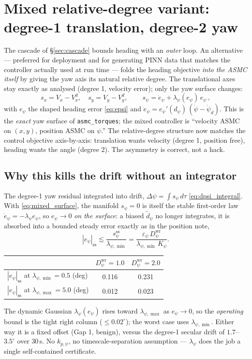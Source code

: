 \documentclass[11pt]{article}
\theoremstyle{plain}
\theoremstyle{definition}
\newcommand{\Vx}{V_x}
\newcommand{\Vy}{V_y}
\newcommand{\Dwr}{D^{\mathrm{wr}}}
\begin{document}
\section{Mixed relative-degree variant: degree-1 translation, degree-2 yaw}
\label{sec:mixed}
The cascade of \S\ref{sec:cascade} bounds heading with an \emph{outer} loop. An
alternative --- preferred for deployment and for generating PINN data that matches the
controller actually used at run time --- folds the heading objective \emph{into the
ASMC itself} by giving the yaw axis its natural relative degree. The translational axes
stay exactly as analysed (degree 1, velocity error); only the yaw surface changes:
\begin{equation}
s_x=\Vx-\Vx^d,\quad s_y=\Vy-\Vy^d,\qquad
\boxed{\,s_\psi=\dot e_\psi+\lambda_\psi(e_\psi)\,e_\psi\,},
\label{eq:mixed_surface}
\end{equation}
with $e_\psi$ the shaped heading error \eqref{eq:epsi} and $\dot e_\psi=e_\psi'(d_\psi)
\,(\dot\psi-\dot\psi_d)$. This is the \emph{exact} yaw surface of \texttt{asmc\_torques};
the mixed controller is ``velocity ASMC on $(x,y)$, position ASMC on $\psi$.'' The
relative-degree structure now matches the control objective axis-by-axis: translation
wants velocity (degree 1, position free), heading wants the angle (degree 2). The
asymmetry is correct, not a hack.

\subsection{Why this kills the drift without an integrator}
The degree-1 yaw residual integrated into drift, $\Delta\psi=\int s_\psi\,d\tau$
\eqref{eq:dpsi_integral}. With \eqref{eq:mixed_surface}, the manifold $s_\psi=0$ is
itself the stable first-order law $\dot e_\psi=-\lambda_\psi e_\psi$, so $e_\psi\to0$
\emph{on the surface}: a biased $\tilde d_\psi$ no longer integrates, it is absorbed
into a bounded steady error exactly as in the position note,
\begin{equation}
|e_\psi|_{\mathrm{ss}}\lesssim\frac{s_\psi^{\mathrm{ss}}}{\lambda_{\psi,\min}}
=\frac{\varepsilon_\psi\,\Dwr_\psi}{\lambda_{\psi,\min}\,K_\psi}.
\label{eq:mixed_ess}
\end{equation}
\begin{center}
\begin{tabular}{lcc}
\toprule
& $\Dwr_\psi=1.0$ & $\Dwr_\psi=2.0$\\
\midrule
$|e_\psi|_{\mathrm{ss}}$ at $\lambda_{\psi,\min}=0.5$ (deg) & 0.116 & 0.231\\
$|e_\psi|_{\mathrm{ss}}$ at $\lambda_{\psi,\max}=5.0$ (deg) & 0.012 & 0.023\\
\bottomrule
\end{tabular}
\end{center}
The dynamic Gaussian $\lambda_\psi(e_\psi)$ rises toward $\lambda_{\psi,\max}$ as
$e_\psi\to0$, so the \emph{operating} bound is the tight right column
($\le0.02^\circ$); the worst case uses $\lambda_{\psi,\min}$. Either way it is a fixed
offset (Gap 1, benign), versus the degree-1 secular drift of $1.7$--$3.5^\circ$ over
$30\,$s. No $k_{p,\psi}$, no timescale-separation assumption --- $\lambda_\psi$ does the
job a single self-contained certificate.
\end{document}

